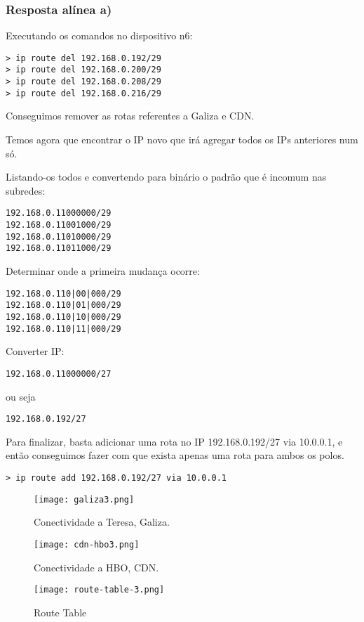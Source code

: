 \documentclass{article}
\begin{document}
\subsubsection{Resposta alínea a)}

Executando os comandos no dispositivo n6:
\begin{lstlisting}
> ip route del 192.168.0.192/29
> ip route del 192.168.0.200/29
> ip route del 192.168.0.208/29
> ip route del 192.168.0.216/29
\end{lstlisting}
Conseguimos remover as rotas referentes a Galiza e CDN.
\bigskip

Temos agora que encontrar o IP novo que irá agregar todos os IPs anteriores num só.

Listando-os todos e convertendo para binário o padrão que é incomum nas subredes:
\begin{lstlisting}
192.168.0.11000000/29
192.168.0.11001000/29
192.168.0.11010000/29
192.168.0.11011000/29
\end{lstlisting}

Determinar onde a primeira mudança ocorre:
\begin{lstlisting}
192.168.0.110|00|000/29
192.168.0.110|01|000/29
192.168.0.110|10|000/29
192.168.0.110|11|000/29
\end{lstlisting}

Converter IP:
\begin{lstlisting}
192.168.0.11000000/27
\end{lstlisting}
 ou seja 
 \begin{lstlisting}
192.168.0.192/27
\end{lstlisting}

Para finalizar, basta adicionar uma rota no IP 192.168.0.192/27 via 10.0.0.1, e então conseguimos fazer com que exista apenas uma rota para ambos os polos.
 \begin{lstlisting}
> ip route add 192.168.0.192/27 via 10.0.0.1
\end{lstlisting}

\begin{figure}[h]
    \centering
    \texttt{[image: galiza3.png]}
    \caption{Conectividade a Teresa, Galiza.}
\end{figure}
\begin{figure}[h]
    \centering
    \texttt{[image: cdn-hbo3.png]}
    \caption{Conectividade a HBO, CDN.}
\end{figure}
\begin{figure}[h]
    \centering
    \texttt{[image: route-table-3.png]}
    \caption{Route Table}
\end{figure}
\pagebreak
\end{document}
